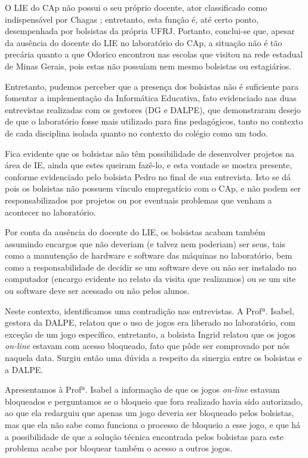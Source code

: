O LIE do CAp não possui o seu próprio docente, ator classificado como indispensável por Chagas \cite{art:REF_ART_CHAGAS}; entretanto, esta função é, até certo ponto, desempenhada por bolsistas da própria UFRJ. Portanto, conclui-se que, apesar da ausência do docente do LIE no laboratório do CAp, a situação não é tão precária quanto a que Odorico \cite{art:REF_ART_ODORICO} encontrou nas escolas que visitou na rede estadual de Minas Gerais, pois estas não possuíam nem mesmo bolsistas ou estagiários.

Entretanto, pudemos perceber que a presença dos bolsistas não é suficiente para fomentar a implementação da Informática Educativa, fato evidenciado nas duas entrevistas realizadas com os gestores (DG e DALPE), que demonstraram desejo de que o laboratório fosse mais utilizado para fins pedagógicos, tanto no contexto de cada disciplina isolada quanto no contexto do colégio como um todo.

Fica evidente que os bolsistas não têm possibilidade de desenvolver projetos na área de IE, ainda que estes queiram fazê-lo, e esta vontade se mostra presente, conforme evidenciado pelo bolsista Pedro no final de sua entrevista. Isto se dá pois os bolsistas não possuem vínculo empregatício com o CAp, e não podem ser responsabilizados por projetos ou por eventuais problemas que venham a acontecer no laboratório.

Por conta da ausência do docente do LIE, os bolsistas acabam também assumindo encargos que não deveriam (e talvez nem poderiam) ser seus, tais como a manutenção de hardware e software das máquinas no laboratório, bem como a responsabilidade de decidir se um software deve ou não ser instalado no computador (encargo evidente no relato da visita que realizamos) ou se um site ou software deve ser acessado ou não pelos alunos.

Neste contexto, identificamos uma contradição nas entrevistas. A Profª. Isabel, gestora da DALPE, relatou que o uso de jogos era liberado no laboratório, com exceção de um jogo específico, entretanto, a bolsista Ingrid relatou que os jogos \textit{on-line} estavam com acesso bloqueado, fato que pôde ser comprovado por nós naquela data. Surgiu então uma dúvida a respeito da sinergia entre os bolsistas e a DALPE.

Apresentamos à Profª. Isabel a informação de que os jogos \textit{on-line} estavam bloqueados e perguntamos se o bloqueio que fora realizado havia sido autorizado, ao que ela redarguiu que apenas um jogo deveria ser bloqueado pelos bolsistas, mas que ela não sabe como funciona o processo de bloqueio a esse jogo, e que há a possibilidade de que a solução técnica encontrada pelos bolsistas para este problema acabe por bloquear também o acesso a outros jogos.

